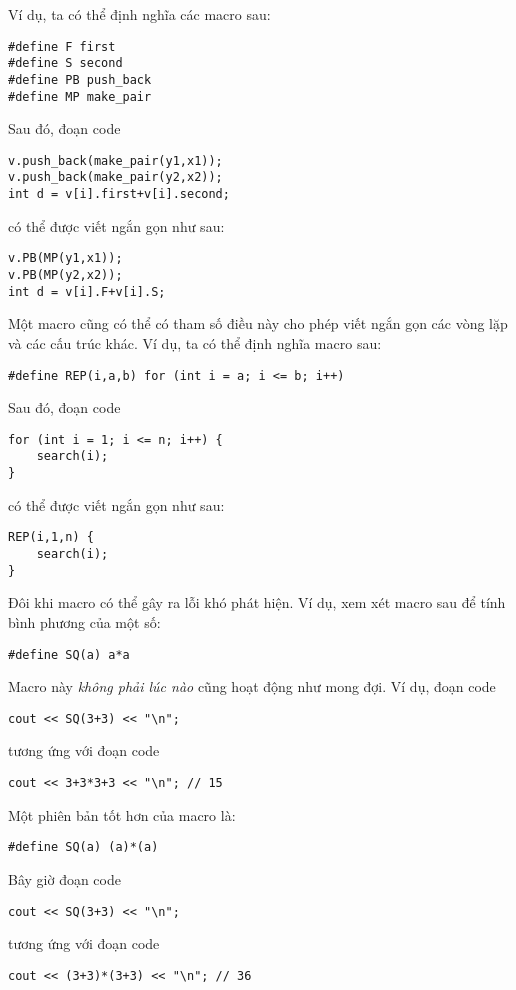 Ví dụ, ta có thể định nghĩa các macro sau:
\begin{lstlisting}
#define F first
#define S second
#define PB push_back
#define MP make_pair
\end{lstlisting}
Sau đó, đoạn code
\begin{lstlisting}
v.push_back(make_pair(y1,x1));
v.push_back(make_pair(y2,x2));
int d = v[i].first+v[i].second;
\end{lstlisting}
có thể được viết ngắn gọn như sau:
\begin{lstlisting}
v.PB(MP(y1,x1));
v.PB(MP(y2,x2));
int d = v[i].F+v[i].S;
\end{lstlisting}

Một macro cũng có thể có tham số
điều này cho phép viết ngắn gọn các vòng lặp và các
cấu trúc khác.
Ví dụ, ta có thể định nghĩa macro sau:
\begin{lstlisting}
#define REP(i,a,b) for (int i = a; i <= b; i++)
\end{lstlisting}
Sau đó, đoạn code
\begin{lstlisting}
for (int i = 1; i <= n; i++) {
    search(i);
}
\end{lstlisting}
có thể được viết ngắn gọn như sau:
\begin{lstlisting}
REP(i,1,n) {
    search(i);
}
\end{lstlisting}

Đôi khi macro có thể gây ra lỗi khó
phát hiện. Ví dụ, xem xét macro sau
để tính bình phương của một số:
\begin{lstlisting}
#define SQ(a) a*a
\end{lstlisting}
Macro này \emph{không phải lúc nào} cũng hoạt động như mong đợi.
Ví dụ, đoạn code
\begin{lstlisting}
cout << SQ(3+3) << "\n";
\end{lstlisting}
tương ứng với đoạn code
\begin{lstlisting}
cout << 3+3*3+3 << "\n"; // 15
\end{lstlisting}

Một phiên bản tốt hơn của macro là:
\begin{lstlisting}
#define SQ(a) (a)*(a)
\end{lstlisting}
Bây giờ đoạn code
\begin{lstlisting}
cout << SQ(3+3) << "\n";
\end{lstlisting}
tương ứng với đoạn code
\begin{lstlisting}
cout << (3+3)*(3+3) << "\n"; // 36
\end{lstlisting}


